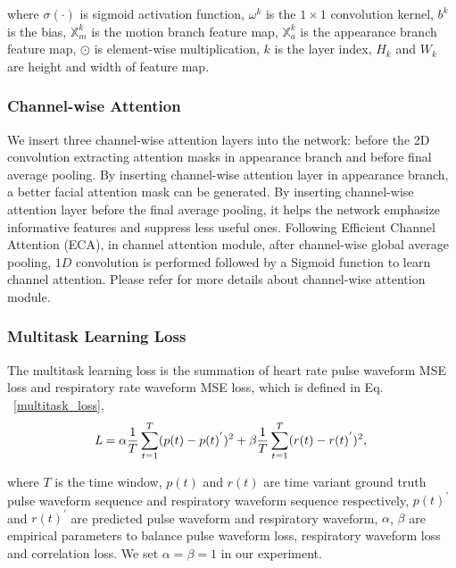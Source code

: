 \documentclass[conference]{IEEEtran}
\begin{document}
where $\sigma(\cdot)$ is sigmoid activation function, $\omega^{k}$ is the $1\times1$ convolution kernel, $b^{k}$ is the bias, $\mathbb{X}_{m}^{k} $ is the motion branch feature map, $\mathbb{X}_{a}^{k} $ is the appearance branch feature map, $\odot$ is element-wise multiplication, $k$ is the layer index,  $H_{k}$ and $W_{k}$ are height and width of feature map.
\subsubsection{Channel-wise Attention}
We insert three channel-wise attention layers into the network: before the 2D convolution extracting attention masks in appearance branch and before final average pooling. By inserting channel-wise attention layer in appearance branch, a better facial attention mask can be generated. By inserting channel-wise attention layer before the final average pooling, it helps the network emphasize informative features and suppress less useful ones. Following Efficient Channel Attention (ECA)\cite{wang2020eca}, in channel attention module, after channel-wise global average pooling, $1D$ convolution is performed followed by a Sigmoid function to learn channel attention. Please refer \cite{wang2020eca} for more details about channel-wise attention module.
\subsubsection{Multitask Learning Loss}
The multitask learning loss is the summation of heart rate pulse waveform MSE loss and respiratory rate waveform MSE loss, which is defined in Eq. ~\ref{multitask_loss},
\begin{dmath}
\textit{L} = \alpha \frac{1}{T} \sum_{t = 1}^{T}(p(t) - p(t)^{'})^{2} + \beta \frac{1}{T} \sum_{t = 1}^{T}(r(t) - r(t)^{'})^{2}, \\
\label{multitask_loss}
\end{dmath}

where $T$ is the time window, $p(t)$ and $r(t)$ are time variant ground truth pulse waveform sequence and respiratory waveform sequence respectively, $p(t)^{'}$ and $r(t)^{'}$ are predicted pulse waveform and respiratory waveform, $\alpha$, $\beta$ are empirical parameters to balance pulse waveform loss, respiratory waveform loss and correlation loss. We set $\alpha=\beta=1$ in our experiment.
\end{document}

